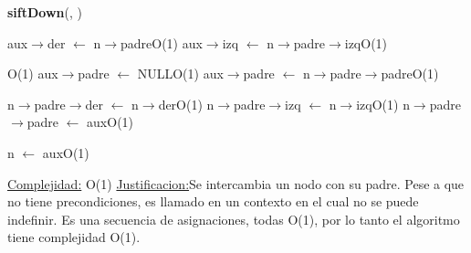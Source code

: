 \begin{Representacion}
\begin{Algoritmos}
\begin{algorithm}[H]{\textbf{siftDown}(, )}
\begin{algorithmic}[1]
		\Else
			\State aux$\rightarrow$der $\leftarrow$ n$\rightarrow$padre\Comment O(1)
			\State aux$\rightarrow$izq $\leftarrow$ n$\rightarrow$padre$\rightarrow$izq\Comment O(1)
		\EndIf
				
			
			
		\Comment O(1)
			\State aux$\rightarrow$padre $\leftarrow$ NULL\Comment O(1)
		\Else
			\State aux$\rightarrow$padre $\leftarrow$ n$\rightarrow$padre$\rightarrow$padre\Comment O(1)
		\EndIf
		
		\State n$\rightarrow$padre$\rightarrow$der $\leftarrow$ n$\rightarrow$der\Comment O(1)
		\State n$\rightarrow$padre$\rightarrow$izq $\leftarrow$ n$\rightarrow$izq\Comment O(1)
		\State n$\rightarrow$padre$\rightarrow$padre $\leftarrow$ aux\Comment O(1)
		
		\State n $\leftarrow$ aux\Comment O(1)
		
		\medskip
		\Statex \underline{Complejidad:} O(1)
			\Statex \underline{Justificacion:}Se intercambia un nodo con su padre. Pese a que no tiene precondiciones, es llamado en un contexto en el cual no se puede indefinir. Es una secuencia de asignaciones, todas O(1), por lo tanto el algoritmo tiene complejidad O(1). 
	\end{algorithmic}
\end{algorithm}



\end{Algoritmos}

\end{Representacion}